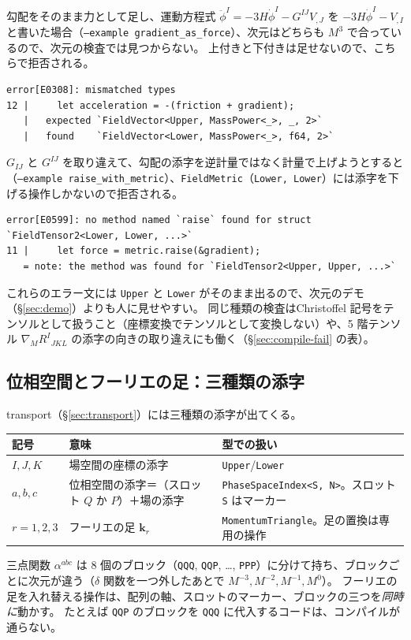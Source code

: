 \documentclass[a4paper,11pt]{ltjsarticle}
\newcommand{\code}[1]{\texttt{#1}}
\begin{document}
勾配をそのまま力として足し、運動方程式 $\ddot\phi^I=-3H\dot\phi^I-G^{IJ}V_{,J}$ を $-3H\dot\phi^I-V_{,I}$ と書いた場合（\code{--example gradient\_as\_force}）、次元はどちらも $M^3$ で合っているので、次元の検査では見つからない。
上付きと下付きは足せないので、こちらで拒否される。
\begin{lstlisting}[language={}]
error[E0308]: mismatched types
12 |     let acceleration = -(friction + gradient);
   |   expected `FieldVector<Upper, MassPower<_>, _, 2>`
   |   found    `FieldVector<Lower, MassPower<_>, f64, 2>`
\end{lstlisting}

$G_{IJ}$ と $G^{IJ}$ を取り違えて、勾配の添字を逆計量ではなく計量で上げようとすると（\code{--example raise\_with\_metric}）、\code{FieldMetric}（\code{Lower, Lower}）には添字を下げる操作しかないので拒否される。
\begin{lstlisting}[language={}]
error[E0599]: no method named `raise` found for struct `FieldTensor2<Lower, Lower, ...>`
11 |     let force = metric.raise(&gradient);
   = note: the method was found for `FieldTensor2<Upper, Upper, ...>`
\end{lstlisting}
これらのエラー文には \code{Upper} と \code{Lower} がそのまま出るので、次元のデモ（\S\ref{sec:demo}）よりも人に見せやすい。
同じ種類の検査はChristoffel 記号をテンソルとして扱うこと（座標変換でテンソルとして変換しない）や、5 階テンソル $\nabla_MR^I{}_{JKL}$ の添字の向きの取り違えにも働く（\S\ref{sec:compile-fail} の表）。

\subsection{位相空間とフーリエの足：三種類の添字}

transport（\S\ref{sec:transport}）には三種類の添字が出てくる。
\begin{center}
\begin{tabular}{lp{5.2cm}p{6.2cm}}
\toprule
記号 & 意味 & 型での扱い \\
\midrule
$I,J,K$ & 場空間の座標の添字 & \code{Upper}/\code{Lower} \\
$a,b,c$ & 位相空間の添字＝（スロット $Q$ か $P$）＋場の添字 & \code{PhaseSpaceIndex<S, N>}。スロット \code{S} はマーカー \\
$r=1,2,3$ & フーリエの足 $\mathbf k_r$ & \code{MomentumTriangle}。足の置換は専用の操作 \\
\bottomrule
\end{tabular}
\end{center}
三点関数 $\alpha^{abc}$ は 8 個のブロック（\code{QQQ}, \code{QQP}, \dots, \code{PPP}）に分けて持ち、ブロックごとに次元が違う（$\delta$ 関数を一つ外したあとで $M^{-3},M^{-2},M^{-1},M^0$）。
フーリエの足を入れ替える操作は、配列の軸、スロットのマーカー、ブロックの三つを\emph{同時に}動かす。
たとえば \code{QQP} のブロックを \code{QQQ} に代入するコードは、コンパイルが通らない。
\end{document}
